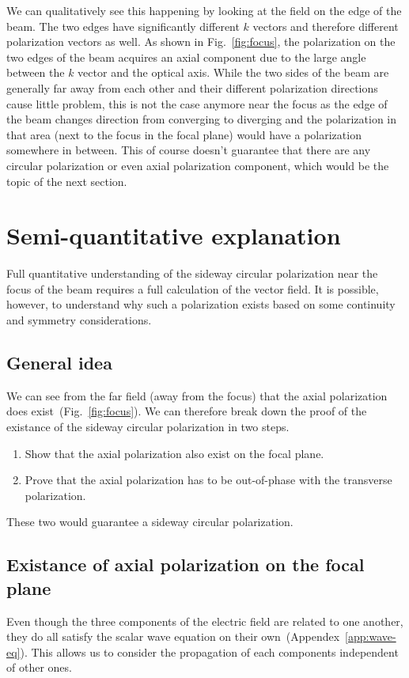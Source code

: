 \documentclass[10pt,fleqn]{article}
\begin{document}
We can qualitatively see this happening by looking at the field
on the edge of the beam.
The two edges have significantly different $k$ vectors
and therefore different polarization vectors as well.
As shown in Fig.~\ref{fig:focus}, the polarization on the two edges of the beam
acquires an axial component due to the large angle between the $k$ vector
and the optical axis. While the two sides of the beam are generally
far away from each other and their different polarization directions cause
little problem, this is not the case anymore near the focus as the edge of the beam
changes direction from converging to diverging and the polarization in that area
(next to the focus in the focal plane) would have a polarization somewhere in between.
This of course doesn't guarantee that there are any circular polarization
or even axial polarization component, which would be the topic of the next section.\\

\section{Semi-quantitative explanation}

Full quantitative understanding of the sideway circular polarization
near the focus of the beam requires a full calculation of the vector field.
It is possible, however, to understand why such a polarization exists
based on some continuity and symmetry considerations.\\

\subsection{General idea}
We can see from the far field (away from the focus)
that the axial polarization does exist~(Fig.~\ref{fig:focus}).
We can therefore break down the proof of the existance of
the sideway circular polarization in two steps.
\begin{enumerate}
\item Show that the axial polarization also exist on the focal plane.
\item Prove that the axial polarization has to be out-of-phase
  with the transverse polarization.
\end{enumerate}
These two would guarantee a sideway circular polarization.\\

\subsection{Existance of axial polarization on the focal plane}
\label{sec:semi:axial-pol}
Even though the three components of the electric field are related to one another,
they do all satisfy the scalar wave equation on their own~(Appendex~\ref{app:wave-eq}).
This allows us to consider the propagation of each components
independent of other ones.\\
\end{document}
